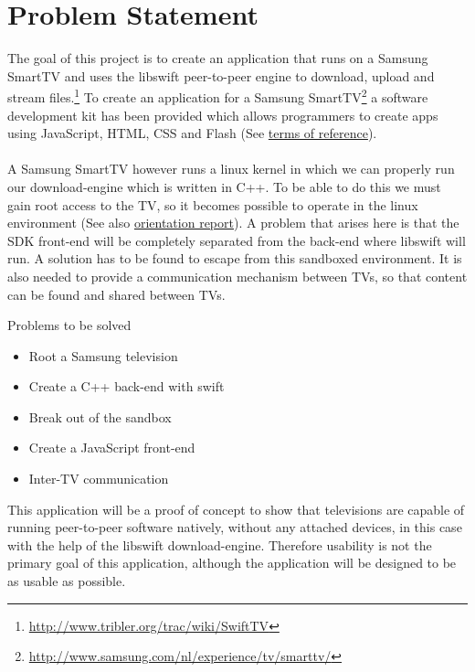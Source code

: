 \chapter{Problem Statement}
\label{sec:problems}
The goal of this project is to create an application that runs on a Samsung SmartTV and uses the libswift peer-to-peer engine to download, upload and stream files.\footnote{\url{http://www.tribler.org/trac/wiki/SwiftTV}} To create an application for a Samsung SmartTV\footnote{\url{http://www.samsung.com/nl/experience/tv/smarttv/}} a software development kit has been provided which allows programmers to create apps using JavaScript, HTML, CSS and Flash (See \hyperref[sec:terms]{terms of reference}).\\\\
A Samsung SmartTV however runs a linux kernel in which we can properly run our download-engine which is written in C++. To be able to do this we must gain root access to the TV, so it becomes possible to operate in the linux environment (See also \hyperref[sec:orientation]{orientation report}). A problem that arises here is that the SDK front-end will be completely separated from the back-end where libswift will run. A solution has to be found to escape from this sandboxed environment. It is also needed to provide a communication mechanism between TV\textquotesingle s,
so that content can be found and shared between TV\textquotesingle s.

Problems to be solved
\begin{itemize}
\item Root a Samsung television
\item Create a C++ back-end with swift
\item Break out of the sandbox
\item Create a JavaScript front-end
\item Inter-TV communication
\end{itemize}

This application will be a proof of concept to show that televisions are capable of running peer-to-peer software natively, without any attached
devices, in this case with the help of the libswift download-engine. Therefore usability is not the primary goal of this application, 
although the application will be designed to be as usable as possible.
